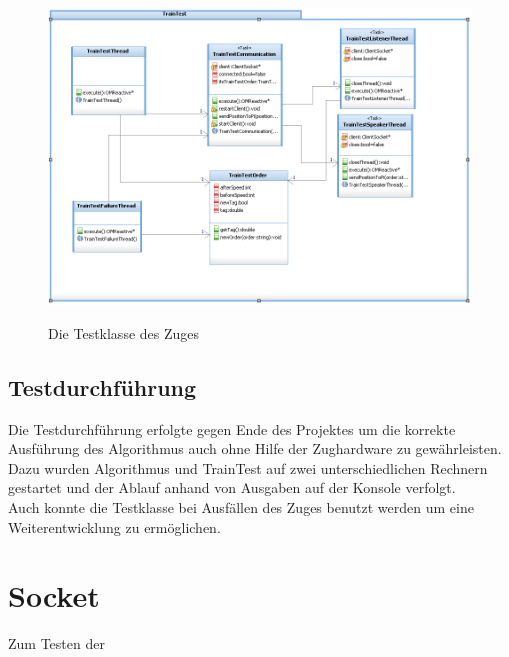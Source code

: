 \begin{figure}
	\caption{Die Testklasse des Zuges}
	\includegraphics[width=1\textwidth]{content/pictures/train_test/train_test.png}
	\label{pic:train_test}
\end{figure}

\subsection{Testdurchführung}

Die Testdurchführung erfolgte gegen Ende des Projektes um die korrekte Ausführung des Algorithmus auch ohne Hilfe der Zughardware zu gewährleisten. Dazu wurden Algorithmus und TrainTest auf zwei unterschiedlichen Rechnern gestartet und der Ablauf anhand von Ausgaben auf der Konsole verfolgt.\\
Auch konnte die Testklasse bei Ausfällen des Zuges benutzt werden um eine Weiterentwicklung zu ermöglichen.

\section{Socket}

Zum Testen der 
